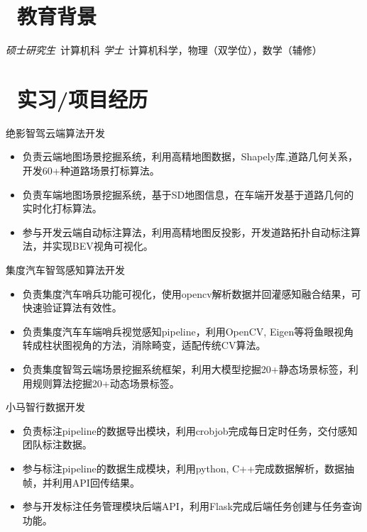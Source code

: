 \documentclass{resume}
\begin{document}


 
\section{\faGraduationCap\  教育背景}
\textit{硕士研究生}\ 计算机科
\textit{学士}\ 计算机科学，物理（双学位），数学（辅修）

\section{\faUsers\ 实习/项目经历}
\role{专家算法工程师}{工作经历}
绝影智驾云端算法开发
\begin{itemize}
  \item 负责云端地图场景挖掘系统，利用高精地图数据，Shapely库,道路几何关系，开发60+种道路场景打标算法。
  \item 负责车端地图场景挖掘系统，基于SD地图信息，在车端开发基于道路几何的实时化打标算法。
  \item 参与开发云端自动标注算法，利用高精地图反投影，开发道路拓扑自动标注算法，并实现BEV视角可视化。
\end{itemize}

集度汽车智驾感知算法开发
\begin{itemize}
  \item 负责集度汽车哨兵功能可视化，使用opencv解析数据并回灌感知融合结果，可快速验证算法有效性。 
  \item 负责集度汽车车端哨兵视觉感知pipeline，利用OpenCV, Eigen等将鱼眼视角转成柱状图视角的方法，消除畸变，适配传统CV算法。
  \item 负责集度智驾云端场景挖掘系统框架，利用大模型挖掘20+静态场景标签，利用规则算法挖掘20+动态场景标签。
\end{itemize}

小马智行数据开发
\begin{itemize}
  \item 负责标注pipeline的数据导出模块，利用crobjob完成每日定时任务，交付感知团队标注数据。
  \item 参与标注pipeline的数据生成模块，利用python, C++完成数据解析，数据抽帧，并利用API回传结果。
  \item 参与开发标注任务管理模块后端API，利用Flask完成后端任务创建与任务查询功能。
\end{itemize}
\end{document}
